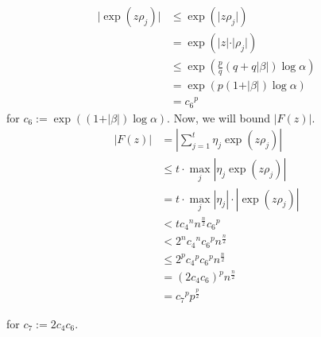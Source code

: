\documentclass[a4paper, 11pt]{book}
\begin{document}
\begin{align*}
    \vert \exp(z\rho_j) \vert &\leq \exp(\vert z\rho_j \vert) \\
                              &= \exp\left(\vert z \vert \cdot \vert \rho_j \vert\right) \\
                              &\leq \exp\left(\frac{p}{q}\left(q + q \vert \beta \vert\right) \log \alpha\right) \\
                              &= \exp(p(1 + \vert \beta \vert) \log \alpha) \\
                              &= {c_6}^{p}
\end{align*}
for $c_6 := \exp((1 + \vert \beta \vert) \log \alpha)$. Now, we will bound $\vert F(z) \vert$.
\begin{align*}
    \vert F(z) \vert &= \left\vert \sum\limits_{j=1}^{t} \eta_{j}\exp(z\rho_j)\right\vert \\
                     &\leq t \cdot \max_{j} \left\vert \eta_j \exp(z\rho_j) \right\vert \\
                     &= t \cdot \max_{j} \left\vert \eta_j \right\vert \cdot \left\vert \exp(z\rho_j) \right\vert \\
                     &< t{c_4}^{n}{n}^{\frac{n}{2}}{c_6}^{p} \\
                     &< 2^{n}{c_4}^{n}{c_6}^{p}{n}^{\frac{n}{2}} \\
                     &\leq 2^{p}{c_4}^{p}{c_6}^{p}{n}^{\frac{n}{2}} \\
                     &= {\left(2c_{4}c_{6}\right)}^{p}{n}^{\frac{n}{2}} \\
                     &={c_7}^{p}{p}^{\frac{p}{2}} 
\end{align*}

for $c_7 := 2c_{4}c_{6}$.\par
\end{document}
